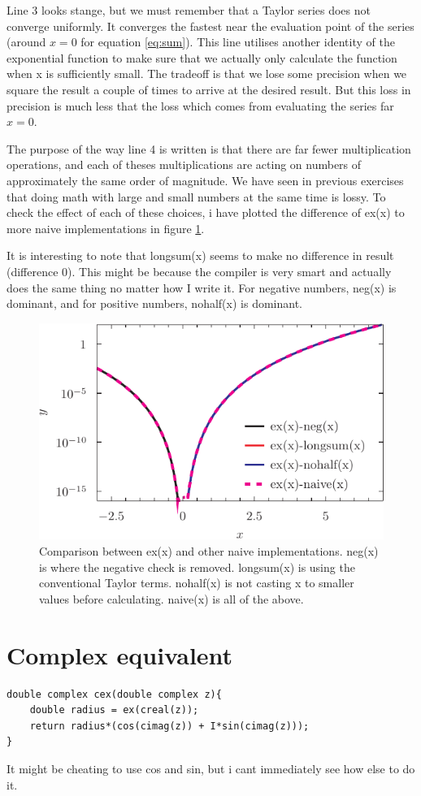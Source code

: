 \documentclass[twocolumn]{article}
\begin{document}
Line 3 looks stange, but we must remember that a Taylor series does not converge uniformly. It converges the fastest near the evaluation point of the series (around $x=0$ for equation \ref{eq:sum}). This line utilises another identity of the exponential function to make sure that we actually only calculate the function when x is sufficiently small. The tradeoff is that we lose some precision when we square the result a couple of times to arrive at the desired result. But this loss in precision is much less that the loss which comes from evaluating the series far $x=0$.

The purpose of the way line 4 is written is that there are far fewer multiplication operations, and each of theses multiplications are acting on numbers of approximately the same order of magnitude. We have seen in previous exercises that doing math with large and small numbers at the same time is lossy. To check the effect of each of these choices, i have plotted the difference of ex(x) to more naive implementations in figure \ref{fig:exp_naive}. 

It is interesting to note that longsum(x) seems to make no difference in result (difference 0). This might be because the compiler is very smart and actually does the same thing no matter how I write it. For negative numbers, neg(x) is dominant, and for positive numbers, nohalf(x) is dominant.

\begin{figure}[h]
\includegraphics[width=\columnwidth]{exp_other.pdf}
\caption{Comparison between ex(x) and other naive implementations. neg(x) is where the negative check is removed. longsum(x) is using the conventional Taylor terms. nohalf(x) is not casting x to smaller values before calculating. naive(x) is all of the above.}
\label{fig:exp_naive}
	\end{figure}
	
	
	
\section{Complex equivalent}

\begin{lstlisting}
double complex cex(double complex z){
	double radius = ex(creal(z));
	return radius*(cos(cimag(z)) + I*sin(cimag(z)));
}
\end{lstlisting}

It might be cheating to use cos and sin, but i cant immediately see how else to do it. 
\end{document}
